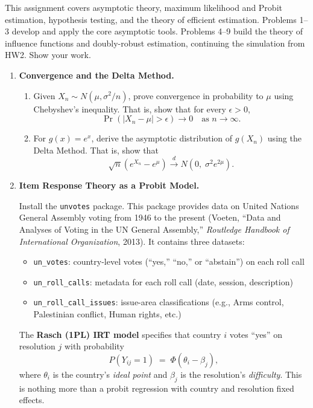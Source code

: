 \documentclass{article}
\theoremstyle{definition}
\begin{document}
This assignment covers asymptotic theory, maximum likelihood and Probit estimation, hypothesis testing, and the theory of efficient estimation.  Problems 1--3 develop and apply the core asymptotic tools.  Problems 4--9 build the theory of influence functions and doubly-robust estimation, continuing the simulation from HW2.  Show your work.

\bigskip

\begin{enumerate}

\item \textbf{Convergence and the Delta Method.}

\begin{enumerate}
  \item Given $X_n \sim N(\mu, \sigma^2/n)$, prove convergence in probability to $\mu$ using Chebyshev's inequality. That is, show that for every $\epsilon > 0$,
  \[
    \Pr\!\left(|X_n - \mu| > \epsilon\right) \to 0 \quad \text{as } n \to \infty.
  \]

  \item For $g(x) = e^x$, derive the asymptotic distribution of $g(X_n)$ using the Delta Method. That is, show that
  \[
    \sqrt{n}\!\left(e^{X_n} - e^{\mu}\right) \xrightarrow{d} N\!\left(0,\; \sigma^2 e^{2\mu}\right).
  \]

\end{enumerate}

\item \textbf{Item Response Theory as a Probit Model.}

Install the \texttt{unvotes} package. This package provides data on United Nations General Assembly voting from 1946 to the present (Voeten, ``Data and Analyses of Voting in the UN General Assembly,'' \emph{Routledge Handbook of International Organization}, 2013). It contains three datasets:
\begin{itemize}
  \item \texttt{un\_votes}: country-level votes (``yes,'' ``no,'' or ``abstain'') on each roll call
  \item \texttt{un\_roll\_calls}: metadata for each roll call (date, session, description)
  \item \texttt{un\_roll\_call\_issues}: issue-area classifications (e.g., Arms control, Palestinian conflict, Human rights, etc.)
\end{itemize}

The \textbf{Rasch (1PL) IRT model} specifies that country $i$ votes ``yes'' on resolution $j$ with probability
\[
  P(Y_{ij} = 1) \;=\; \Phi(\theta_i - \beta_j),
\]
where $\theta_i$ is the country's \emph{ideal point} and $\beta_j$ is the resolution's \emph{difficulty}. This is nothing more than a probit regression with country and resolution fixed effects.


\end{enumerate}
\end{document}
